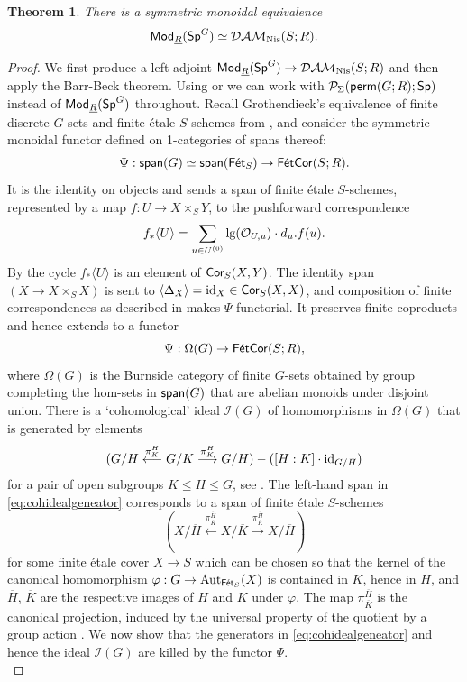 \documentclass[reqno]{amsart}
\numberwithin{equation}{section}\theoremstyle{thms}
\newtheorem{thm}[equation]{Theorem}
\theoremstyle{defn}
\newcommand{\cI}{\mathcal{I}}
\newcommand{\cO}{\mathcal{O}}
\newcommand{\cP}{\mathcal{P}}
\newcommand{\tn}[1]{\textnormal{#1}}
\newcommand{\tsf}[1]{\textsf{\textup{#1}}}
\newcommand{\mcal}[1]{\mathcal{#1}}
\newcommand{\underl}[1]{\underline{#1}}
\newcommand{\overl}[1]{\overline{#1}}
\newcommand{\psigma}{\cP_{\Sigma}}
\newcommand{\Mod}{\tsf{Mod}}
\newcommand{\spans}{\tsf{span}}
\newcommand{\spec}{\tsf{Sp}}
\newcommand{\specg}{\tsf{Sp}^G}
\newcommand{\permgr}{\tsf{perm}(G;R)}
\newcommand{\fets}{\tsf{Fét}_S}
\newcommand{\corfets}[1]{\tsf{FétCor}(S;#1)}
\begin{document}
\begin{thm}\label{thm:damnisasmodunderlr}
There is a symmetric monoidal equivalence 
$$\Mod_{\underl{R}}(\specg) \simeq \mcal{DAM}_{\tn{Nis}}(S;R).$$
\end{thm}
\begin{proof}
We first produce a left adjoint $\Mod_{\underl{R}}(\specg) \to \mcal{DAM}_{\tn{Nis}}(S;R)$ and then apply the Barr-Beck theorem. Using \cite[Example 2.15]{bcn25} or \cite[Corollary 3.18]{fuh25} we can work with $\psigma(\permgr;\spec)$ instead of $\Mod_{\underl{R}}(\specg)$ throughout. Recall Grothendieck's equivalence of finite discrete $G$-sets and finite étale $S$-schemes from \cite{sga1}, and consider the symmetric monoidal functor defined on 1-categories of spans thereof: 
\begin{align*}
\Psi: \spans(G) \simeq \spans(\fets) \to \corfets{R}.
\end{align*}
It is the identity on objects and sends a span of finite étale $S$-schemes, represented by a map $f: U \to X \times_S Y$, to the pushforward correspondence 
$$f_*\langle U \rangle = \sum_{u \in U^{(0)}} \tn{lg}(\cO_{U,u}) \cdot d_u. f(u).$$
By \cite[9.1.1, Lemma 10.2.6]{cd19} the cycle $f_*\langle U \rangle$ is an element of $\tsf{Cor}_S(X,Y)$. The identity span $(X \to X \times_S X)$ is sent to $\langle \Delta_X \rangle = \tn{id}_X \in \tsf{Cor}_S(X,X)$, and composition of finite correspondences as described in \cite[Definition 9.1.5]{cd19} makes $\Psi$ functorial. It preserves finite coproducts and hence extends to a functor
$$\Psi: \Omega(G) \to \corfets{R},$$
where $\Omega(G)$ is the Burnside category of finite $G$-sets obtained by group completing the hom-sets in $\spans(G)$ that are abelian monoids under disjoint union. There is a `cohomological' ideal $\cI(G)$ of homomorphisms in $\Omega(G)$ that is generated by elements
\begin{equation}\label{eq:cohidealgeneator}
(G/H \stackrel{\pi^H_K}{\longleftarrow} G/K \stackrel{\pi^H_K}{\longrightarrow} G/H) - ([H:K] \cdot \tn{id}_{G/H})
\end{equation}
for a pair of open subgroups $K \leq H \leq G$, see \cite[§4]{bg23}. The left-hand span in \ref{eq:cohidealgeneator} corresponds to a span of finite étale $S$-schemes
\begin{equation}\label{eq:spangenerator}
(X/\overl{H} \stackrel{\pi^{\overl{H}}_{\overl{K}}}{\longleftarrow} X/\overl{K} \stackrel{\pi^{\overl{H}}_{\overl{K}}}{\longrightarrow} X/\overl{H})
\end{equation}
for some finite étale cover $X \to S$ which can be chosen so that the kernel of the canonical homomorphism $\varphi: G \to \tn{Aut}_{\fets}(X)$ is contained in $K$, hence in $H$, and $\overl{H}$, $\overl{K}$ are the respective images of $H$ and $K$ under $\varphi$. The map $\pi^{\overl{H}}_{\overl{K}}$ is the canonical projection, induced by the universal property of the quotient by a group action \cite[Proposition 20.87]{gw23}. We now show that the generators in \ref{eq:cohidealgeneator} and hence the ideal $\cI(G)$ are killed by the functor $\Psi$. \\

\end{proof}
\end{document}
